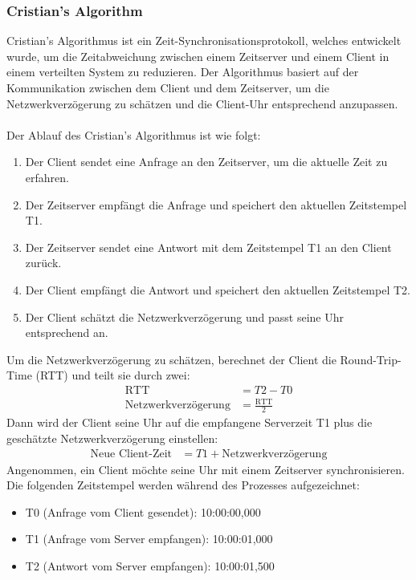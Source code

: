 \subsubsection{Cristian's Algorithm}
Cristian's Algorithmus ist ein Zeit-Synchronisationsprotokoll, welches entwickelt wurde, um die Zeitabweichung zwischen einem Zeitserver und einem Client in einem verteilten System zu reduzieren. Der Algorithmus basiert auf der Kommunikation zwischen dem Client und dem Zeitserver, um die Netzwerkverzögerung zu schätzen und die Client-Uhr entsprechend anzupassen.
\\\\
Der Ablauf des Cristian's Algorithmus ist wie folgt:
\begin{enumerate}
\item Der Client sendet eine Anfrage an den Zeitserver, um die aktuelle Zeit zu erfahren.
\item Der Zeitserver empfängt die Anfrage und speichert den aktuellen Zeitstempel T1.
\item Der Zeitserver sendet eine Antwort mit dem Zeitstempel T1 an den Client zurück.
\item Der Client empfängt die Antwort und speichert den aktuellen Zeitstempel T2.
\item Der Client schätzt die Netzwerkverzögerung und passt seine Uhr entsprechend an.
\end{enumerate}
Um die Netzwerkverzögerung zu schätzen, berechnet der Client die Round-Trip-Time (RTT) und teilt sie durch zwei:
\begin{align*}
\text{RTT} &= T2 - T0 \\
\text{Netzwerkverzögerung} &= \frac{\text{RTT}}{2}
\end{align*}
Dann wird der Client seine Uhr auf die empfangene Serverzeit T1 plus die geschätzte Netzwerkverzögerung einstellen:
\begin{align*}
\text{Neue Client-Zeit} &= T1 + \text{Netzwerkverzögerung}
\end{align*}
Angenommen, ein Client möchte seine Uhr mit einem Zeitserver synchronisieren. Die folgenden Zeitstempel werden während des Prozesses aufgezeichnet:
\begin{itemize}
\item T0 (Anfrage vom Client gesendet): 10:00:00,000
\item T1 (Anfrage vom Server empfangen): 10:00:01,000
\item T2 (Antwort vom Server empfangen): 10:00:01,500
\end{itemize}
